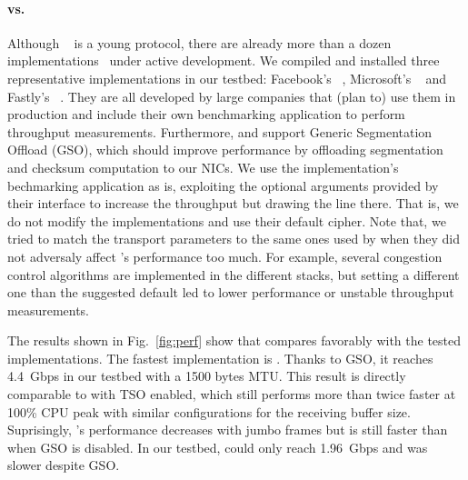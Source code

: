 \paragraph{\tcpls vs. \quic}
Although \quic~\cite{draft-ietf-quic-transport} is a young protocol, there are
already more than a dozen
implementations~\cite{marx2020same,quicimplem,yang2020making} under active
development. We compiled and installed three representative \quic
implementations in our testbed: Facebook's \mvfst~\cite{mvfst-github,Joras_mvfst},
Microsoft's \msquic~\cite{msquic-github} and Fastly's
\quicly~\cite{quicly-github}. They are all developed by large companies that (plan to) use
them in production and include their own benchmarking application to perform
throughput measurements. Furthermore, \mvfst and \quicly support Generic
Segmentation Offload (GSO), which should improve performance by offloading \udp
segmentation and checksum computation to our NICs. We use the
implementation's bechmarking application as is, exploiting the optional
arguments provided by their interface to increase the throughput but drawing the
line there. That is, we do not modify the \quic implementations and use their default
cipher. Note that, we
tried to match the transport parameters to the same ones used by \tcpls when they did not
adversaly affect \quic's performance too much. For example, several congestion
control algorithms are implemented in the different \quic stacks, but setting a
different one than the suggested default led to lower performance or unstable
throughput measurements.

The results shown in Fig.~\ref{fig:perf} show that \tcpls compares favorably
with the tested \quic implementations. The fastest \quic implementation is
\quicly. Thanks to GSO, it reaches 4.4~Gbps in our testbed with a 1500 bytes
MTU. This result is directly comparable to \tcpls with TSO enabled, which still
performs more than twice faster at 100\% CPU peak with similar configurations
for the receiving buffer size. Suprisingly, \quicly's performance decreases with
jumbo frames but is still faster than when GSO is disabled. In our testbed,
\msquic could only reach 1.96~Gbps and \mvfst was slower despite GSO.




